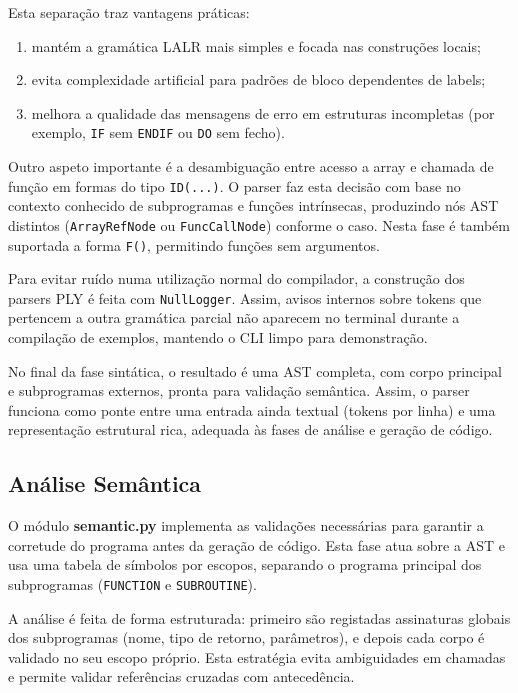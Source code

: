 \documentclass{article}
\begin{document}
Esta separação traz vantagens práticas:
\begin{enumerate}
\item mantém a gramática LALR mais simples e focada nas construções locais;
\item evita complexidade artificial para padrões de bloco dependentes de labels;
\item melhora a qualidade das mensagens de erro em estruturas incompletas (por exemplo, \texttt{IF} sem \texttt{ENDIF} ou \texttt{DO} sem fecho).
\end{enumerate}

Outro aspeto importante é a desambiguação entre acesso a array e chamada de função em formas
do tipo \texttt{ID(...)}. O parser faz esta decisão com base no contexto conhecido de
subprogramas e funções intrínsecas, produzindo nós AST distintos (\texttt{ArrayRefNode} ou
\texttt{FuncCallNode}) conforme o caso. Nesta fase é também suportada a forma \texttt{F()},
permitindo funções sem argumentos.

Para evitar ruído numa utilização normal do compilador, a construção dos parsers PLY é feita
com \texttt{NullLogger}. Assim, avisos internos sobre tokens que pertencem a outra gramática
parcial não aparecem no terminal durante a compilação de exemplos, mantendo o CLI limpo para
demonstração.

No final da fase sintática, o resultado é uma AST completa, com corpo principal e subprogramas externos, pronta para validação semântica. Assim, o parser funciona como ponte entre uma entrada ainda textual (tokens por linha) e uma representação estrutural rica, adequada às fases de análise e geração de código.

\subsection{Análise Semântica}

O módulo \textbf{semantic.py} implementa as validações necessárias para garantir a
corretude do programa antes da geração de código. Esta fase atua sobre a AST e usa uma
tabela de símbolos por escopos, separando o programa principal dos subprogramas
(\texttt{FUNCTION} e \texttt{SUBROUTINE}).

A análise é feita de forma estruturada: primeiro são registadas assinaturas globais dos
subprogramas (nome, tipo de retorno, parâmetros), e depois cada corpo é validado no seu
escopo próprio. Esta estratégia evita ambiguidades em chamadas e permite validar referências
cruzadas com antecedência.
\end{document}
